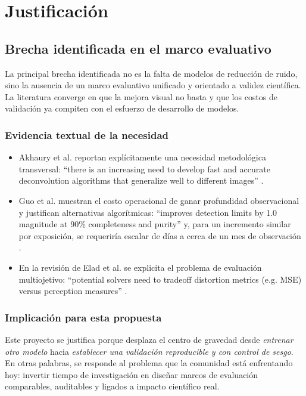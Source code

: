 \chapter{Justificaci\'on}

\section{Brecha identificada en el marco evaluativo}

La principal brecha identificada no es la falta de modelos de reducci\'on de ruido, sino la ausencia de un marco evaluativo unificado y orientado a validez cient\'ifica. La literatura converge en que la mejora visual no basta y que los costos de validaci\'on ya compiten con el esfuerzo de desarrollo de modelos.

\subsection{Evidencia textual de la necesidad}

\begin{itemize}
    \item Akhaury et al. reportan expl\'icitamente una necesidad metodol\'ogica transversal: \enquote{there is an increasing need to develop fast and accurate deconvolution algorithms that generalize well to different images} \cite{akhaury2022deep}.
    \item Guo et al. muestran el costo operacional de ganar profundidad observacional y justifican alternativas algor\'itmicas: \enquote{improves detection limits by 1.0 magnitude at 90\% completeness and purity} y, para un incremento similar por exposici\'on, se requerir\'ia escalar de d\'ias a cerca de un mes de observaci\'on \cite{guo2026detection}.
    \item En la revisi\'on de Elad et al. se explicita el problema de evaluaci\'on multiojetivo: \enquote{potential solvers need to tradeoff distortion metrics (e.g. MSE) versus perception measures} \cite{elad2023revolution}.
\end{itemize}

\subsection{Implicaci\'on para esta propuesta}

Este proyecto se justifica porque desplaza el centro de gravedad desde \emph{entrenar otro modelo} hacia \emph{establecer una validaci\'on reproducible y con control de sesgo}. En otras palabras, se responde al problema que la comunidad est\'a enfrentando hoy: invertir tiempo de investigaci\'on en dise\~nar marcos de evaluaci\'on comparables, auditables y ligados a impacto cient\'ifico real.

